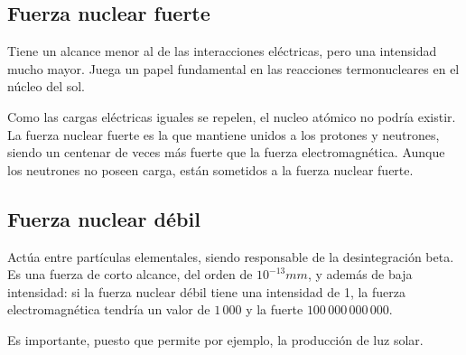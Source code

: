 \subsection{Fuerza nuclear fuerte}

Tiene un alcance menor al de las interacciones eléctricas,
pero una intensidad mucho mayor.
Juega un papel fundamental en las reacciones termonucleares en el núcleo del sol.

Como las cargas eléctricas iguales se repelen,
el nucleo atómico no podría existir.
La fuerza nuclear fuerte es la que mantiene unidos a los protones y neutrones,
siendo un centenar de veces más fuerte que la fuerza electromagnética.
Aunque los neutrones no poseen carga,
están sometidos a la fuerza nuclear fuerte.

\subsection{Fuerza nuclear débil}

Actúa entre partículas elementales,
siendo responsable de la desintegración beta.
Es una fuerza de corto alcance, 
del orden de \(10^{-13} mm\),
y además de baja intensidad:
si la fuerza nuclear débil tiene una intensidad de 1,
la fuerza electromagnética tendría un valor de \(1\,000\)
y la fuerte \(100\,000\,000\,000\).

Es importante, puesto que permite por ejemplo, la producción de luz solar.